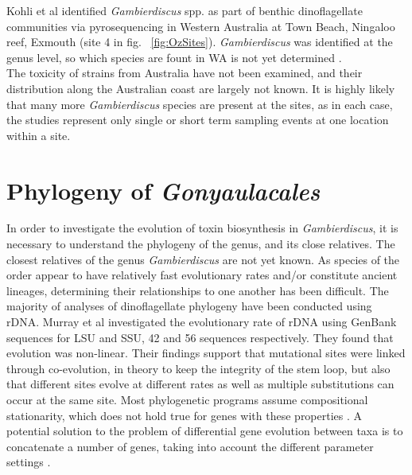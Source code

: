 \documentclass[12pt]{article}
\begin{document}
Kohli et al identified \emph{Gambierdiscus} spp. as part of benthic dinoflagellate communities via pyrosequencing in Western Australia at Town Beach, Ningaloo reef, Exmouth (site 4 in fig. ~\ref{fig:OzSites}).  \emph{Gambierdiscus} was identified at the genus level, so which species are fount in WA is not yet determined \cite{kohli2014cob}. \\

 The toxicity of strains from Australia have not been examined, and their distribution along the Australian coast are largely not known. It is highly likely that many more \emph{Gambierdiscus} species are present at the sites, as in each case, the studies represent only single or short term sampling events at one location within a site.


\section{Phylogeny of \emph{Gonyaulacales}}
In order to investigate the evolution of toxin biosynthesis in \textit{Gambierdiscus}, it is necessary to understand the phylogeny of the genus, and its close relatives. The closest relatives of the genus \textit{Gambierdiscus} are not yet known.  As species of the order appear to have relatively fast evolutionary rates and/or constitute ancient lineages, determining their relationships to one another has been difficult. The majority of analyses of dinoflagellate phylogeny have been conducted using rDNA. Murray et al investigated the evolutionary rate of rDNA using GenBank sequences for LSU and SSU, 42 and 56 sequences respectively. They found that evolution was non-linear. Their findings support that mutational sites were linked through co-evolution, in theory to keep the integrity of the stem loop, but also that different sites evolve at different rates as well as multiple substitutions can occur at the same site. Most phylogenetic programs assume compositional stationarity, which does not hold true for genes with these properties \cite{murray2005improving}. A potential solution to the problem of differential gene evolution between taxa is to concatenate a number of genes, taking into account the different parameter settings \cite{gontcharov2004combined,pupko2002combining}.\\
\end{document}
